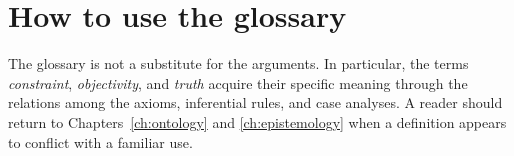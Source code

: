 \section*{How to use the glossary}

The glossary is not a substitute for the arguments. In particular, the terms
\emph{constraint}, \emph{objectivity}, and \emph{truth} acquire their specific
meaning through the relations among the axioms, inferential rules, and case
analyses. A reader should return to Chapters~\ref{ch:ontology} and
\ref{ch:epistemology} when a definition appears to conflict with a familiar use.
